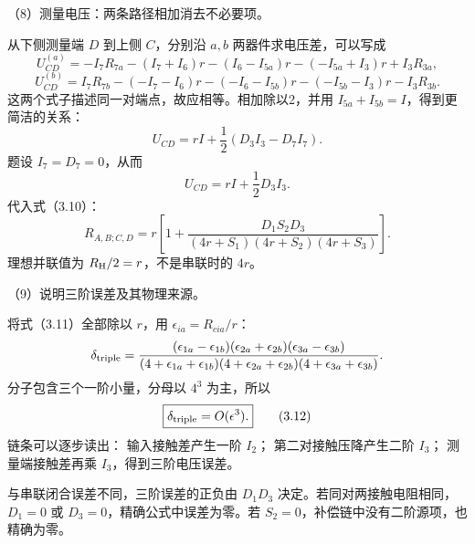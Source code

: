 \documentclass[12pt,a4paper,fontset=fandol]{ctexart}
\begin{document}
（8）测量电压：两条路径相加消去不必要项。

从下侧测量端 \(D\) 到上侧 \(C\)，分别沿 \(a,b\) 两器件求电压差，可以写成
\[
U_{CD}^{(a)}
=-I_7R_{7a}-(I_7+I_6)r
-(I_6-I_{5a})r-(-I_{5a}+I_3)r+I_3R_{3a},
\] \[
U_{CD}^{(b)}
=I_7R_{7b}-(-I_7-I_6)r
-(-I_6-I_{5b})r-(-I_{5b}-I_3)r-I_3R_{3b}.
\] 这两个式子描述同一对端点，故应相等。相加除以2，并用
\(I_{5a}+I_{5b}=I\)，得到更简洁的关系： \[
U_{CD}=rI+\frac12(D_3I_3-D_7I_7).
\] 题设 \(I_7=D_7=0\)，从而 \[
U_{CD}=rI+\frac12D_3I_3.
\] 代入式（3.10）： \[
\boxed{
R_{A,B;C,D}
=r\left[
1+\frac{D_1S_2D_3}
{(4r+S_1)(4r+S_2)(4r+S_3)}
\right].}\tag{3.11}
\] 理想并联值为 \(R_{\rm H}/2=r\)，不是串联时的 \(4r\)。

（9）说明三阶误差及其物理来源。

将式（3.11）全部除以 \(r\)，用 \(\epsilon_{ia}=R_{cia}/r\)： \[
\delta_{\rm triple}=
\frac{(\epsilon_{1a}-\epsilon_{1b})
(\epsilon_{2a}+\epsilon_{2b})
(\epsilon_{3a}-\epsilon_{3b})}
{(4+\epsilon_{1a}+\epsilon_{1b})
(4+\epsilon_{2a}+\epsilon_{2b})
(4+\epsilon_{3a}+\epsilon_{3b})}.
\] 分子包含三个一阶小量，分母以 \(4^3\) 为主，所以 \[
\boxed{\delta_{\rm triple}=O(\epsilon^3).}\tag{3.12}
\] 链条可以逐步读出： 输入接触差产生一阶 \(I_2\)；
第二对接触压降产生二阶 \(I_3\)； 测量端接触差再乘
\(I_3\)，得到三阶电压误差。

\begin{center}
\begin{minipage}{\linewidth}
\centering\begingroup
{}
\ifdim\wd\diagrambox>.88\linewidth
\sbox{\diagrambox}{\resizebox{.88\linewidth}{!}{\usebox{\diagrambox}}}
\fi
\ifdim\ht\diagrambox>.40\textheight
\resizebox{!}{.40\textheight}{\usebox{\diagrambox}}
\else\usebox{\diagrambox}\fi
\par{}
\endgroup\end{minipage}
\end{center}

与串联闭合误差不同，三阶误差的正负由 \(D_1D_3\)
决定。若同对两接触电阻相同，\(D_1=0\) 或
\(D_3=0\)，精确公式中误差为零。若
\(S_2=0\)，补偿链中没有二阶源项，也精确为零。
\end{document}
